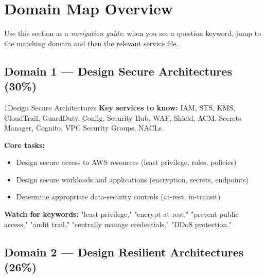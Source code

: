 
\section{Domain Map Overview}

Use this section as a \emph{navigation guide}: when you see a question keyword,
jump to the matching domain and then the relevant service file.

\subsection{Domain 1 — Design Secure Architectures (30\%)}

\begin{domainsummary}{1}{Design Secure Architectures}
\textbf{Key services to know:} IAM, STS, KMS, CloudTrail, GuardDuty, Config,
Security Hub, WAF, Shield, ACM, Secrets Manager, Cognito, VPC Security Groups, NACLs.

\textbf{Core tasks:}
\begin{itemize}
  \item Design secure access to AWS resources (least privilege, roles, policies)
  \item Design secure workloads and applications (encryption, secrets, endpoints)
  \item Determine appropriate data-security controls (at-rest, in-transit)
\end{itemize}

\textbf{Watch for keywords:} "least privilege," "encrypt at rest," "prevent public access,"
"audit trail," "centrally manage credentials," "DDoS protection."
\end{domainsummary}

\subsection{Domain 2 — Design Resilient Architectures (26\%)}


